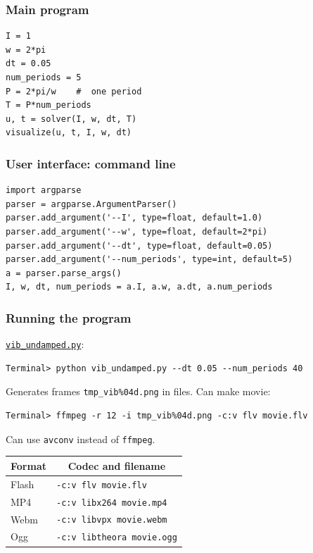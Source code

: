\documentclass{beamer}
\begin{document}
\begin{frame}
\frametitle{Main program}

\begin{verbatim}
I = 1
w = 2*pi
dt = 0.05
num_periods = 5
P = 2*pi/w    #  one period
T = P*num_periods
u, t = solver(I, w, dt, T)
visualize(u, t, I, w, dt)
\end{verbatim}
\end{frame}

\begin{frame}
\frametitle{User interface: command line}

\begin{verbatim}
import argparse
parser = argparse.ArgumentParser()
parser.add_argument('--I', type=float, default=1.0)
parser.add_argument('--w', type=float, default=2*pi)
parser.add_argument('--dt', type=float, default=0.05)
parser.add_argument('--num_periods', type=int, default=5)
a = parser.parse_args()
I, w, dt, num_periods = a.I, a.w, a.dt, a.num_periods
\end{verbatim}
\end{frame}

\begin{frame}
\frametitle{Running the program}

\href{{http://tinyurl.com/nm5587k/vib/vib_undamped.py}}{\nolinkurl{vib_undamped.py}}:

\begin{verbatim}
Terminal> python vib_undamped.py --dt 0.05 --num_periods 40
\end{verbatim}

Generates frames \Verb!tmp_vib%04d.png! in files. Can make movie:

\begin{verbatim}
Terminal> ffmpeg -r 12 -i tmp_vib%04d.png -c:v flv movie.flv
\end{verbatim}
Can use \texttt{avconv} instead of \texttt{ffmpeg}.


{\footnotesize
\begin{tabular}{ll}
\hline
\multicolumn{1}{c}{ Format } & \multicolumn{1}{c}{ Codec and filename } \\
\hline
Flash  & \texttt{-c:v flv movie.flv}       \\
MP4    & \texttt{-c:v libx264 movie.mp4}   \\
Webm   & \texttt{-c:v libvpx movie.webm}   \\
Ogg    & \texttt{-c:v libtheora movie.ogg} \\
\hline
\end{tabular}
}

\noindent
\end{frame}
\end{document}
